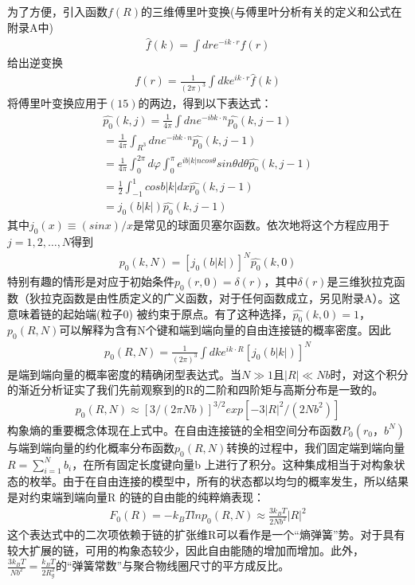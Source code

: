 为了方便，引入函数$f(R)$的三维傅里叶变换(与傅里叶分析有关的定义和公式在附录A中)\\
\begin{gather}
\hat{f}(k)=\int dre^{-ik \cdot r}f(r)
\end{gather}
给出逆变换\\
\begin{gather}
 f(r)=\frac{1}{(2 \pi)^3} \int dke^{ik \cdot r} \hat{f}(k)
\end{gather}
将傅里叶变换应用于$(15)$的两边，得到以下表达式：\\
\begin{gather}
\hat{p_0}(k,j)=\frac{1}{4 \pi} \int dne^{-ibk \cdot n} \hat{p_0}(k,j-1) \\=\frac{1}{4 \pi} \int _{R^3}dne^{-ibk \cdot n} \hat{p_0}(k,j-1) \\=
\frac{1}{4 \pi} \int _{0}^{2 \pi}d \varphi \int _{0}^{\pi} e^{ib|k|n cos \theta}sin \theta d \theta \hat{p_0}(k,j-1) \\=\frac{1}{2} \int _{-1}^{1}cos b|k|dx \hat{p_0}(k,j-1) \\=j_0(b|k|)\hat{p_0}(k,j-1)
\end{gather}
其中$j_0(x) \equiv (sinx)/x$是常见的球面贝塞尔函数。依次地将这个方程应用于$j=1,2,\ldots,N$得到\\
\begin{gather}
\hat{p_0}(k,N)=[j_0(b|k|)]^{N}\hat{p_0}(k,0)
\end{gather}
特别有趣的情形是对应于初始条件$p_0(r,0)=\delta(r)$，其中$\delta(r)$是三维狄拉克函数（狄拉克函数是由性质定义的广义函数，对于任何函数成立，另见附录A）。这意味着链的起始端(粒子$0$) 被约束于原点。有了这种选择，$\hat{p_0}(k,0)=1$，$p_0(R,N)$可以解释为含有N个键和端到端向量的自由连接链的概率密度。因此\\
\begin{gather}
p_0(R,N)=\frac{1}{(2 \pi)^3 }\int dke^{ik \cdot R}[j_0(b|k|)]^{N}
\end{gather}
是端到端向量的概率密度的精确闭型表达式。当$N\gg1$且$|R| \ll Nb $时，对这个积分的渐近分析证实了我们先前观察到的R的二阶和四阶矩与高斯分布是一致的。\\
\begin{gather}
p_0(R,N) \approx [3/(2 \pi Nb)]^{3/2}exp[-3|R|^2/(2Nb^2)]
\end{gather}
构象熵的重要概念体现在上式中。在自由连接链的全相空间分布函数$P_0(r_0，b^{N})$与端到端向量的约化概率分布函数$p_0(R,N)$转换的过程中，我们固定端到端向量$R=\sum _{i=1}^{N} b_{i}$，在所有固定长度键向量b 上进行了积分。这种集成相当于对构象状态的枚举。由于在自由连接的模型中，所有的状态都以均匀的概率发生，所以结果是对约束端到端向量R 的链的自由能的纯粹熵表现：\\
\begin{gather}
F_0(R)=-k_{B}Tlnp_0(R,N)\approx \frac{3k_{B}T}{2Nb^2}|R|^2
\end{gather}
这个表达式中的二次项依赖于链的扩张维R可以看作是一个“熵弹簧”势。对于具有较大扩展的链，可用的构象态较少，因此自由能随的增加而增加。此外，$\frac{3k_{B}T}{Nb^2}=\frac{k_{B}T}{2R^2_{g}}$的“弹簧常数”与聚合物线圈尺寸的平方成反比。\\

